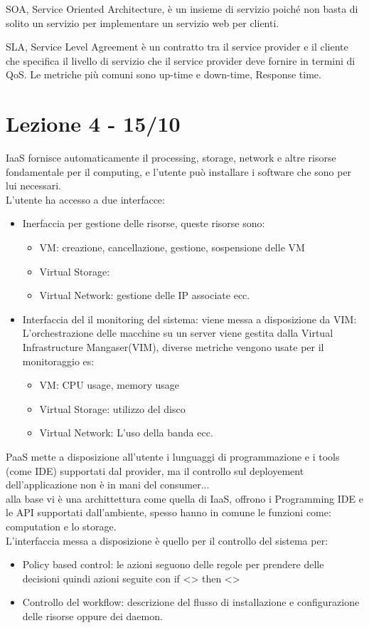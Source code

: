 \documentclass[11pt, twocolumn]{article}
\begin{document}
SOA, Service Oriented Architecture, è un insieme di servizio poiché non basta di solito un servizio per implementare un servizio web per clienti.

SLA, Service Level Agreement è un contratto tra il service provider e il cliente che specifica il livello di servizio che il service provider deve fornire in termini di QoS.
Le metriche più comuni sono up-time e down-time, Response time.

\section{Lezione 4 - 15/10}
IaaS fornisce automaticamente il processing, storage, network e altre risorse fondamentale per il computing, e l'utente può installare i software che sono per lui necessari.
\\
L'utente ha accesso a due interfacce:
\begin{itemize}
	\item Inerfaccia per gestione delle risorse, queste risorse sono:
	\begin{itemize}
		\item VM: creazione, cancellazione, gestione, sospensione delle VM 
		\item Virtual Storage:
		\item Virtual Network: gestione delle IP associate ecc.
	\end{itemize}
	\item Interfaccia del il monitoring del sistema: viene messa a disposizione da VIM: L'orchestrazione delle macchine su un server viene gestita dalla Virtual Infrastructure Mangaser(VIM), diverse metriche vengono usate per il monitoraggio es:
	\begin{itemize}
		\item VM: CPU usage, memory usage
		\item Virtual Storage: utilizzo del disco
		\item Virtual Network: L'uso della banda ecc.
	\end{itemize}
\end{itemize}
 
PaaS mette a disposizione all'utente i lunguaggi di programmazione e i tools (come IDE) supportati dal provider, ma il controllo sul deployement dell'applicazione non è in mani del consumer...
\\
alla base vi è una archittettura come quella di IaaS, offrono i Programming IDE e le API supportati dall'ambiente, spesso hanno in comune le funzioni come: computation e lo storage.
\\
L'interfaccia messa a disposizione è quello per il controllo del sistema per:
\begin{itemize}
	\item Policy based control: le azioni seguono delle regole per prendere delle decisioni quindi azioni seguite con if <> then <>
	\item Controllo del workflow: descrizione del flusso di installazione e configurazione delle risorse oppure dei daemon.
\end{itemize}
\end{document}
